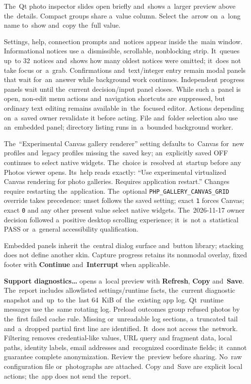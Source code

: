 \documentclass[11pt,a4paper]{article}
\newcommand{\ui}[1]{\textbf{#1}}
\newcommand{\codeword}[1]{\nolinkurl{#1}}
\begin{document}
The~Qt photo inspector slides open briefly and~shows a~larger preview above
the~details. Compact groups share a~value column. Select the~arrow on~a~long
name to~show and~copy the~full value.

Settings, help, connection prompts and~notices appear inside the~main window.
Informational notices use a~dismissible, scrollable, nonblocking strip. It~queues
up~to 32~notices and~shows how many oldest notices were omitted; it~does not
take focus or~a~grab. Confirmations and~text/integer entry remain modal panels
that wait for~an~answer while background work continues. Independent progress
panels wait until the~current decision/input panel closes. While such a~panel is
open, non-edit menu actions and~navigation shortcuts are suppressed, but
ordinary text editing remains available in~the~focused editor. Actions
depending on~a~saved
owner revalidate it before acting. File and~folder selection also use an~embedded
panel; directory listing runs in~a~bounded background worker.

The~“Experimental Canvas gallery renderer” setting defaults to~Canvas for~new
profiles and~legacy profiles missing the~saved key; an~explicitly saved OFF
continues to select native widgets. The~choice is~resolved at~startup before
any Photos viewer opens. Its~help reads exactly:
“Use experimental virtualized Canvas rendering for photo galleries. Requires
application restart.” Changes require restarting the~application. The~optional
\codeword{PHP_GALLERY_CANVAS_GRID} override takes precedence: unset follows the
saved setting; exact \codeword{1} forces Canvas; exact \codeword{0} and any other
present value select native widgets. The~2026-11-17 owner decision followed
a~positive desktop scrolling experience; it~is~not a~statistical PASS or~a~general
accessibility qualification.

Embedded panels inherit the~central dialog surface and~button library; stacking
does not define another skin. Capture progress retains its nonmodal overlay,
fixed footer with \ui{Continue} and~\ui{Interrupt} when applicable.

\ui{Support diagnostics…} opens a~local preview with \ui{Refresh}, \ui{Copy}
and~\ui{Save}. The~report includes allowlisted settings/runtime facts, the~current
diagnostic snapshot and~up~to the~last 64~KiB of~the~existing app log.
Qt~runtime messages use the~same rotating log. Preload outcomes group refused
photos by the~first failed cache rule. Missing
or~unreadable log sections, a~truncated tail and~a~dropped partial first line
are identified. It~does not
access the~network. Filtering removes credential-like values, URL query and
fragment data, local paths, identity labels, email addresses and~recognized
coordinate fields; it~cannot guarantee complete anonymization. Review the~preview
before sharing. No~raw configuration file or~photographs are attached. Copy
and~Save are explicit local actions; the~app does not send the~report.
\end{document}
